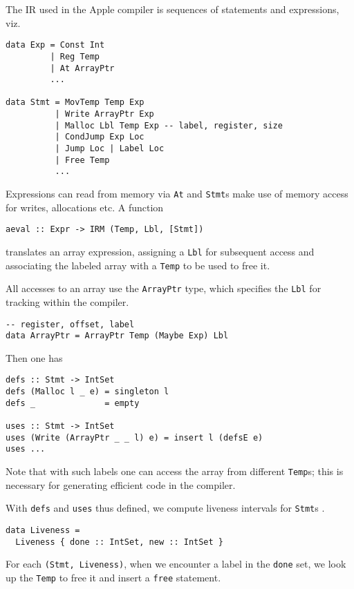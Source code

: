\documentclass[sigplan,screen]{acmart}
\begin{document}
The IR used in the Apple compiler is sequences of statements and expressions, viz.

\begin{verbatim}
data Exp = Const Int
         | Reg Temp
         | At ArrayPtr
         ...

data Stmt = MovTemp Temp Exp
          | Write ArrayPtr Exp
          | Malloc Lbl Temp Exp -- label, register, size
          | CondJump Exp Loc
          | Jump Loc | Label Loc
          | Free Temp
          ...
\end{verbatim}

Expressions can read from memory via {\tt At} and {\tt Stmt}s make use of memory access for writes, allocations etc. A function

\begin{verbatim}
aeval :: Expr -> IRM (Temp, Lbl, [Stmt])
\end{verbatim}
translates an array expression, assigning a {\tt Lbl} for subsequent access and associating the labeled array with a {\tt Temp} to be used to free it.

All accesses to an array use the {\tt ArrayPtr} type, which specifies the {\tt Lbl} for tracking within the compiler.

\begin{verbatim}
-- register, offset, label
data ArrayPtr = ArrayPtr Temp (Maybe Exp) Lbl
\end{verbatim}

Then one has

\begin{verbatim}
defs :: Stmt -> IntSet
defs (Malloc l _ e) = singleton l
defs _              = empty

uses :: Stmt -> IntSet
uses (Write (ArrayPtr _ _ l) e) = insert l (defsE e)
uses ...
\end{verbatim}


Note that with such labels one can access the array from different {\tt Temp}s; this is necessary for generating efficient code in the compiler.

With {\tt defs} and {\tt uses} thus defined, we compute liveness intervals for {\tt Stmt}s \cite{poletto1999}.

\begin{verbatim}
data Liveness =
  Liveness { done :: IntSet, new :: IntSet }
\end{verbatim}

For each {\tt (Stmt, Liveness)}, when we encounter a label in the {\tt done} set, we look up the {\tt Temp} to free it and insert a {\tt free} statement.
\end{document}
